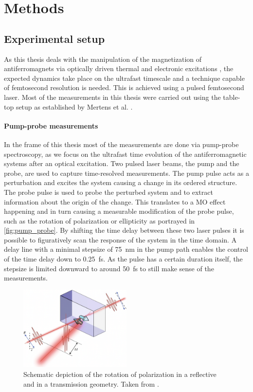 \chapter{Methods}
\section{Experimental setup}
As this thesis deals with the manipulation of the magnetization of antiferromagnets via optically driven thermal and electronic excitations \cite{song_how_2018}, the expected dynamics take place on the ultrafast timescale and a technique capable of femtosecond resolution is needed.
This is achieved using a pulsed femtosecond laser.
Most of the measurements in this thesis were carried out using the table-top setup as established by Mertens et al. \cite{mertens_wide_2020}.

\subsubsection*{Pump-probe measurements}
In the frame of this thesis most of the measurements are done via pump-probe spectroscopy, as we focus on the ultrafast time evolution of the antiferromagnetic systems after an optical excitation.
Two pulsed laser beams, the pump and the probe, are used to capture time-resolved measurements.
The pump pulse acts as a perturbation and excites the system causing a change in its ordered structure.
The probe pulse is used to probe the perturbed system and to extract information about the origin of the change. 
This translates to a MO effect happening and in turn causing a measurable modification of the probe pulse, such as the rotation of polarization or ellipticity as portrayed in \autoref{fig:pump_probe}.
By shifting the time delay between these two laser pulses it is possible to figuratively scan the response of the system in the time domain.
A delay line with a minimal stepsize of \qty{75}{nm} in the pump path enables the control of the time delay down to \qty{0.25}{fs}.
As the pulse has a certain duration itself, the stepsize is limited downward to around \qty{50}{fs} to still make sense of the measurements.
\begin{figure}[ht]
    \centering
    \includegraphics[width=0.5\textwidth]{pictures/pump_probe.png}
    \caption{Schematic depiction of the rotation of polarization in a reflective and in a transmission geometry. Taken from \cite{nemec_antiferromagnetic_2018}.}
    \label{fig:pump_probe}
\end{figure}

